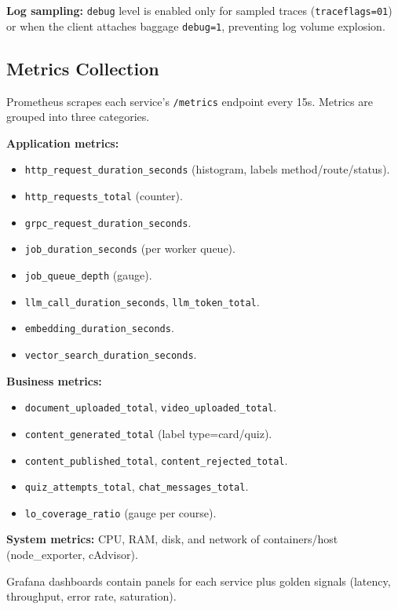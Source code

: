 \textbf{Log sampling:} \texttt{debug} level is enabled only for sampled
traces (\texttt{traceflags=01}) or when the client attaches baggage
\texttt{debug=1}, preventing log volume explosion.

\subsection{Metrics Collection}

Prometheus scrapes each service's \texttt{/metrics} endpoint every 15s.
Metrics are grouped into three categories.

\textbf{Application metrics:}
\begin{itemize}
    \item \texttt{http\_request\_duration\_seconds} (histogram, labels
          method/route/status).
    \item \texttt{http\_requests\_total} (counter).
    \item \texttt{grpc\_request\_duration\_seconds}.
    \item \texttt{job\_duration\_seconds} (per worker queue).
    \item \texttt{job\_queue\_depth} (gauge).
    \item \texttt{llm\_call\_duration\_seconds}, \texttt{llm\_token\_total}.
    \item \texttt{embedding\_duration\_seconds}.
    \item \texttt{vector\_search\_duration\_seconds}.
\end{itemize}

\textbf{Business metrics:}
\begin{itemize}
    \item \texttt{document\_uploaded\_total}, \texttt{video\_uploaded\_total}.
    \item \texttt{content\_generated\_total} (label type=card/quiz).
    \item \texttt{content\_published\_total},
          \texttt{content\_rejected\_total}.
    \item \texttt{quiz\_attempts\_total}, \texttt{chat\_messages\_total}.
    \item \texttt{lo\_coverage\_ratio} (gauge per course).
\end{itemize}

\textbf{System metrics:} CPU, RAM, disk, and network of containers/host
(node\_exporter, cAdvisor).

Grafana dashboards contain panels for each service plus golden signals
(latency, throughput, error rate, saturation).

